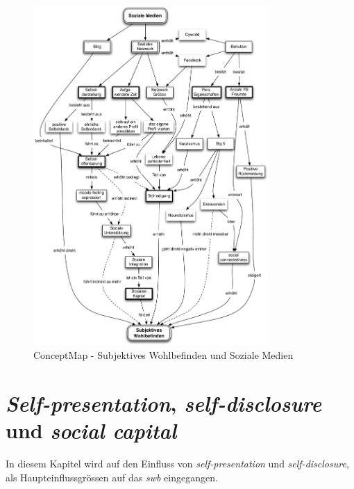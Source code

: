 \begin{figure}[H]
	\centering
		\includegraphics[width=0.8\textwidth]{images/grafiken/conceptMap_Swb_Sm_v2.pdf}
	\caption{ConceptMap - Subjektives Wohlbefinden und Soziale Medien}
	\label{fig.ConceptMapSwbSm}
\end{figure}

\section{\textit{Self-presentation}, \textit{self-disclosure} und \textit{social capital}}\label{sub.selfp}
In diesem Kapitel wird auf den Einfluss von \textit{self-presentation} und \textit{self-disclosure}, als Haupteinflussgrössen auf das \textit{\gls{swb}} eingegangen. \newline
